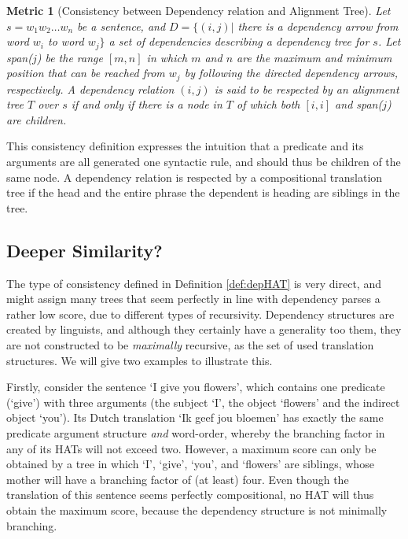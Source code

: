 \documentclass{report}
\theoremstyle{break}
\newtheorem{metric}{Metric}
\begin{document}
\begin{metric}[Consistency between Dependency relation and Alignment Tree]\label{met:depHAT}
Let $s = w_1 w_2 \dots w_n$ be a sentence, and $D = \{ (i,j) |$ there is a dependency arrow from word $w_i$ to word $w_j \}$ a set of dependencies describing a dependency tree for $s$. Let span($j$) be the range $[m,n]$ in which $m$ and $n$ are the maximum and minimum position that can be reached from $w_j$ by following the directed dependency arrows, respectively. A dependency relation $(i,j)$ is said to be respected by an alignment tree $T$ over $s$ if and only if there is a node in $T$ of which both $[i,i]$ and span($j$) are children.
\end{metric}

\noindent This consistency definition expresses the intuition that a predicate and its arguments are all generated one syntactic rule, and should thus be children of the same node. A dependency relation is respected by a compositional translation tree if the head and the entire phrase the dependent is heading are siblings in the tree.

\subsection{Deeper Similarity?}

The type of consistency defined in Definition \ref{def:depHAT} is very direct, and might assign many trees that seem perfectly in line with dependency parses a rather low score, due to different types of recursivity. Dependency structures are created by linguists, and although they certainly have a generality too them, they are not constructed to be \textit{maximally} recursive, as the set of used translation structures. We will give two examples to illustrate this.

Firstly, consider the sentence `I give you flowers', which contains one predicate (`give') with three arguments (the subject `I', the object `flowers' and the indirect object `you'). Its Dutch translation `Ik geef jou bloemen' has exactly the same predicate argument structure \textit{and} word-order, whereby the branching factor in any of its HATs will not exceed two. However, a maximum score can only be obtained by a tree in which `I', `give', `you', and `flowers' are siblings, whose mother will have a branching factor of (at least) four. Even though the translation of this sentence seems perfectly compositional, no HAT will thus obtain the maximum score, because the dependency structure is not minimally branching.
\end{document}
